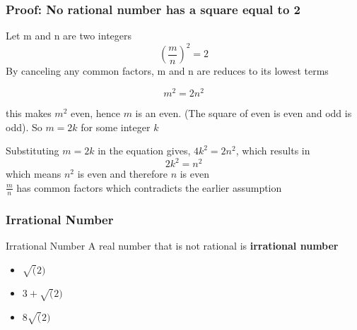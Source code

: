 \begin{frame}
    \frametitle{Proof: No rational number has a square equal to 2}
    Let m and n are two integers
    \[ 
        \left( \frac{m}{n} \right)^{2} = 2  
    \]
    By canceling any common factors, m and n are reduces to its lowest terms 

    \[
         m^{2} = 2n^{2}
    \]

    this makes \(m^{2}\) even, hence \(m\) is an even. (The square of even is even and odd is odd). So \(m = 2k\) for some integer \(k\)

    Substituting \(m = 2k\) in the equation gives, \(4k^{2} = 2n^{2} \), which results in 
    \[
        2k^{2} = n^{2}
    \]
    which means \( n^{2}\) is even and therefore \(n \) is even
    \\
    \(\frac{m}{n} \) has common factors which contradicts the earlier assumption
\end{frame}
\begin{frame}
    \frametitle{Irrational Number}

    \begin{block}{Irrational Number}
        A real number that is not rational is \textbf{irrational number}
    \end{block}
    \begin{itemize}
        \item \( \sqrt(2)\)
        \item \(3+\sqrt(2)\)
        \item \(8\sqrt(2)\)
    \end{itemize}
\end{frame}